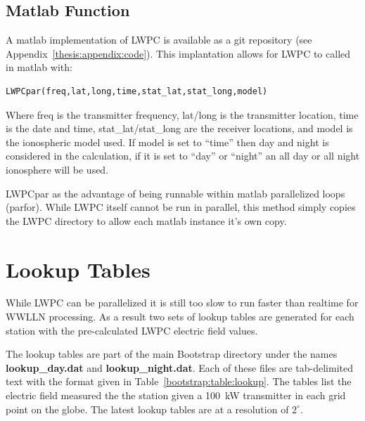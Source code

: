 \subsection{Matlab Function}

A matlab implementation of LWPC is available as a git repository (see Appendix~\ref{thesis:appendix:code}).
This implantation allows for LWPC to called in matlab with:

\begin{verbatim}
LWPCpar(freq,lat,long,time,stat_lat,stat_long,model)
\end{verbatim}

Where freq is the transmitter frequency, lat/long is the transmitter location, time is the date and time, stat\_lat/stat\_long are the receiver locations, and model is the ionospheric model used.
If model is set to ``time'' then day and night is considered in the calculation, if it is set to ``day'' or ``night'' an all day or all night ionosphere will be used.

LWPCpar as the advantage of being runnable within matlab parallelized loops (parfor).
While LWPC itself cannot be run in parallel, this method simply copies the LWPC directory to allow each matlab instance it's own copy.

\section{Lookup Tables}

While LWPC can be parallelized it is still too slow to run faster than realtime for WWLLN processing.
As a result two sets of lookup tables are generated for each station with the pre-calculated LWPC electric field values.

The lookup tables are part of the main Bootstrap directory under the names \textbf{lookup\_day.dat} and \textbf{lookup\_night.dat}.
Each of these files are tab-delimited text with the format given in Table~\ref{bootstrap:table:lookup}.
The tables list the electric field measured the the station given a 100~kW transmitter in each grid point on the globe.
The latest lookup tables are at a resolution of $2^\circ$.

